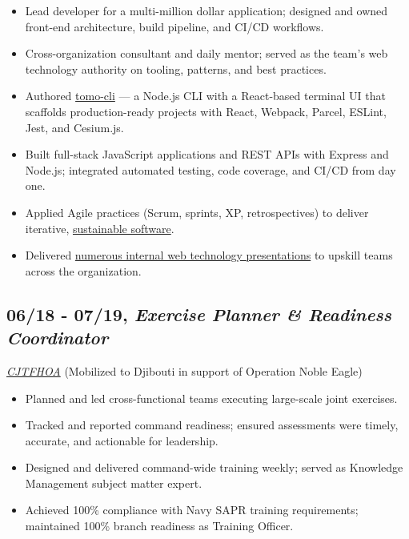 \documentclass[10pt]{article}
\def\tightlist{}
\begin{document}
\begin{itemize}
\tightlist
\item
  Lead developer for a multi-million dollar application; designed and
  owned front-end architecture, build pipeline, and CI/CD workflows.
\item
  Cross-organization consultant and daily mentor; served as the team's
  web technology authority on tooling, patterns, and best practices.
\item
  Authored \href{https://github.com/jhwohlgemuth/tomo-cli}{tomo-cli} ---
  a Node.js CLI with a React-based terminal UI that scaffolds
  production-ready projects with React, Webpack, Parcel, ESLint, Jest,
  and Cesium.js.
\item
  Built full-stack JavaScript applications and REST APIs with Express
  and Node.js; integrated automated testing, code coverage, and CI/CD
  from day one.
\item
  Applied Agile practices (Scrum, sprints, XP, retrospectives) to
  deliver iterative, \href{http://sustainable.surge.sh/}{sustainable
  software}.
\item
  Delivered
  \href{https://github.com/jhwohlgemuth?utf8=\%E2\%9C\%93&tab=repositories&q=slides&type=source&language=}{numerous
  internal web technology presentations} to upskill teams across the
  organization.
\end{itemize}

\subsection{\texorpdfstring{06/18 - 07/19, \textbf{\emph{Exercise
Planner \& Readiness
Coordinator}}}{06/18 - 07/19, Exercise Planner \& Readiness Coordinator}}\label{exercise-planner-readiness-coordinator}

\emph{\href{https://twitter.com/CJTFHOA}{CJTFHOA}} (Mobilized to
Djibouti in support of Operation Noble Eagle)

\begin{itemize}
\tightlist
\item
  Planned and led cross-functional teams executing large-scale joint
  exercises.
\item
  Tracked and reported command readiness; ensured assessments were
  timely, accurate, and actionable for leadership.
\item
  Designed and delivered command-wide training weekly; served as
  Knowledge Management subject matter expert.
\item
  Achieved 100\% compliance with Navy SAPR training requirements;
  maintained 100\% branch readiness as Training Officer.
\end{itemize}
\end{document}
